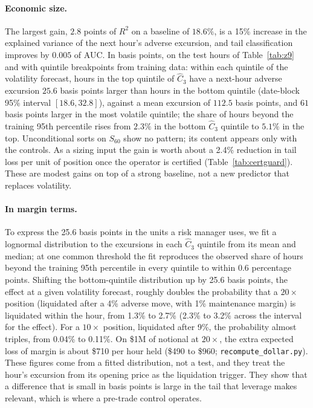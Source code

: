 \documentclass[12pt]{article}
\theoremstyle{definition}
\theoremstyle{remark}
\begin{document}
\paragraph{Economic size.} The largest gain, $2.8$ points of $R^2$ on a baseline of $18.6\%$, is a 15\% increase in the explained variance of the next hour's adverse excursion, and tail classification improves by $0.005$ of AUC. In basis points, on the test hours of Table~\ref{tab:z9} and with quintile breakpoints from training data: within each quintile of the volatility forecast, hours in the top quintile of $\hat C_3$ have a next-hour adverse excursion $25.6$ basis points larger than hours in the bottom quintile (date-block 95\% interval $[18.6,32.8]$), against a mean excursion of $112.5$ basis points, and $61$ basis points larger in the most volatile quintile; the share of hours beyond the training 95th percentile rises from $2.3\%$ in the bottom $\hat C_3$ quintile to $5.1\%$ in the top. Unconditional sorts on $S_{60}$ show no pattern; its content appears only with the controls. As a sizing input the gain is worth about a 2.4\% reduction in tail loss per unit of position once the operator is certified (Table~\ref{tab:certguard}). These are modest gains on top of a strong baseline, not a new predictor that replaces volatility.

\paragraph{In margin terms.} To express the 25.6 basis points in the units a risk manager uses, we fit a lognormal distribution to the excursions in each $\hat C_3$ quintile from its mean and median; at one common threshold the fit reproduces the observed share of hours beyond the training 95th percentile in every quintile to within 0.6 percentage points. Shifting the bottom-quintile distribution up by 25.6 basis points, the effect at a given volatility forecast, roughly doubles the probability that a $20\times$ position (liquidated after a 4\% adverse move, with 1\% maintenance margin) is liquidated within the hour, from 1.3\% to 2.7\% (2.3\% to 3.2\% across the interval for the effect). For a $10\times$ position, liquidated after 9\%, the probability almost triples, from 0.04\% to 0.11\%. On \$1M of notional at $20\times$, the extra expected loss of margin is about \$710 per hour held (\$490 to \$960; \texttt{recompute\_dollar.py}). These figures come from a fitted distribution, not a test, and they treat the hour's excursion from its opening price as the liquidation trigger. They show that a difference that is small in basis points is large in the tail that leverage makes relevant, which is where a pre-trade control operates.
\end{document}
